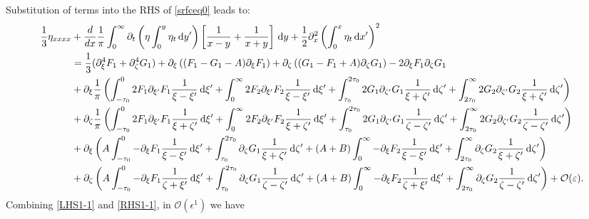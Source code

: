 \documentclass[10pt,reqno,oneside,a4paper, landscape]{article}
\begin{document}
Substitution of terms into the RHS of \eqref{srfceq0} leads to:
\begin{align}
\frac{1}{3} \eta_{xxxx} &+ \frac{d}{dx} \frac{1}{\pi} \int_0^\infty \partial_t \left( \eta \int^{y}_0\eta_{t} \,\mathrm{d} y' \right) \left[ \frac{1}{x-y} + \frac{1}{x+y} \right] \,\mathrm{d} y + \frac{1}{2} \partial^2_x\left(\int^{x}_0\eta_{t} \,\mathrm{d} x' \right)^2 \nonumber\\
&=  \frac{1}{3}(\partial_\xi^4 F_1 + \partial_\zeta^4 G_1) + \partial_\xi \left( (F_1 - G_1 - A) \partial_\xi F_1 \right) + \partial_\zeta \left((G_1 - F_1 + A)\partial_\zeta G_1 \right) - 2 \partial_\xi F_1\partial_\zeta G_1 \nonumber \\
&+ \partial_\xi \frac{1}{\pi} \left( \int^0_{-\tau_0} 2 F_1 \partial_{\xi'} F_1 \frac{1}{\xi -\xi'} \,\mathrm{d} \xi' + \int^{\infty}_{0} 2 F_2 \partial_{\xi'} F_2 \frac{1}{\xi -\xi'} \,\mathrm{d} \xi' + \int^{2\tau_0}_{\tau_0} 2 G_1 \partial_{\zeta'} G_1 \frac{1}{\xi + \zeta'} \,\mathrm{d} \zeta' + \int^{\infty}_{2\tau_0} 2 G_2 \partial_{\zeta'} G_2 \frac{1}{\xi + \zeta'} \,\mathrm{d} \zeta' \right) \nonumber \\
&+ \partial_\zeta \frac{1}{\pi} \left( \int^0_{-\tau_0} 2 F_1 \partial_{\xi'} F_1 \frac{1}{\xi + \zeta'} \,\mathrm{d} \xi' + \int^{\infty}_{0} 2 F_2 \partial_{\xi'} F_2 \frac{1}{\xi + \zeta'} \,\mathrm{d} \xi' + \int^{2\tau_0}_{\tau_0} 2 G_1 \partial_{\zeta'} G_1 \frac{1}{\zeta -\zeta'} \,\mathrm{d} \zeta' + \int^{\infty}_{2\tau_0} 2 G_2 \partial_{\zeta'} G_2 \frac{1}{\zeta -\zeta'} \,\mathrm{d} \zeta' \right) \nonumber \\ 
&+ \partial_\xi \left( A \int^0_{-\tau_0} -\partial_\xi F_1 \frac{1}{\xi - \xi'} \,\mathrm{d} \xi' + \int^{2\tau_0}_{\tau_0} \partial_\zeta G_1 \frac{1}{\xi + \zeta'} \,\mathrm{d} \zeta' + (A+B)\int_0^{\infty} -\partial_\xi F_2 \frac{1}{\xi - \xi'} \,\mathrm{d} \xi' + \int_{2\tau_0}^{\infty} \partial_\zeta G_2 \frac{1}{\xi + \zeta'} \,\mathrm{d} \zeta' \right) \nonumber \\
&+ \partial_\zeta \left( A \int^0_{-\tau_0} -\partial_\xi F_1  \frac{1}{\zeta + \xi'}  \,\mathrm{d} \xi' + \int^{2\tau_0}_{\tau_0} \partial_\zeta G_1 \frac{1}{\zeta - \zeta'} \,\mathrm{d} \zeta' + (A+B) \int_0^{\infty} -\partial_\xi F_2  \frac{1}{\zeta + \xi'} \,\mathrm{d} \xi'  + \int_{2\tau_0}^{\infty} \partial_\zeta G_2 \frac{1}{\zeta - \zeta'}\,\mathrm{d} \zeta'  \right)+ \mathcal{O}(\varepsilon).  \label{RHS1-1}
\end{align}
Combining \eqref{LHS1-1} and \eqref{RHS1-1}, in $\mathcal{O}(\epsilon^1)$ we have
\end{document}
